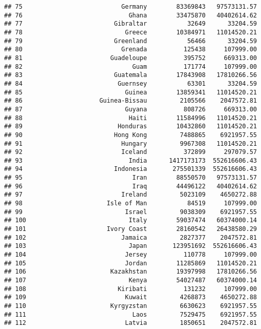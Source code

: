 \documentclass[
]{article}
\begin{document}
\begin{verbatim}
## 75                           Germany        83369843   97573131.57
## 76                             Ghana        33475870   40402614.62
## 77                         Gibraltar           32649      33204.59
## 78                            Greece        10384971   11014520.21
## 79                         Greenland           56466      33204.59
## 80                           Grenada          125438     107999.00
## 81                        Guadeloupe          395752     669313.00
## 82                              Guam          171774     107999.00
## 83                         Guatemala        17843908   17810266.56
## 84                          Guernsey           63301      33204.59
## 85                            Guinea        13859341   11014520.21
## 86                     Guinea-Bissau         2105566    2047572.81
## 87                            Guyana          808726     669313.00
## 88                             Haiti        11584996   11014520.21
## 89                          Honduras        10432860   11014520.21
## 90                         Hong Kong         7488865    6921957.55
## 91                           Hungary         9967308   11014520.21
## 92                           Iceland          372899     297079.57
## 93                             India      1417173173  552616606.43
## 94                         Indonesia       275501339  552616606.43
## 95                              Iran        88550570   97573131.57
## 96                              Iraq        44496122   40402614.62
## 97                           Ireland         5023109    4650272.88
## 98                       Isle of Man           84519     107999.00
## 99                            Israel         9038309    6921957.55
## 100                            Italy        59037474   60374000.14
## 101                      Ivory Coast        28160542   26438580.29
## 102                          Jamaica         2827377    2047572.81
## 103                            Japan       123951692  552616606.43
## 104                           Jersey          110778     107999.00
## 105                           Jordan        11285869   11014520.21
## 106                       Kazakhstan        19397998   17810266.56
## 107                            Kenya        54027487   60374000.14
## 108                         Kiribati          131232     107999.00
## 109                           Kuwait         4268873    4650272.88
## 110                       Kyrgyzstan         6630623    6921957.55
## 111                             Laos         7529475    6921957.55
## 112                           Latvia         1850651    2047572.81

\end{verbatim}
\end{document}
